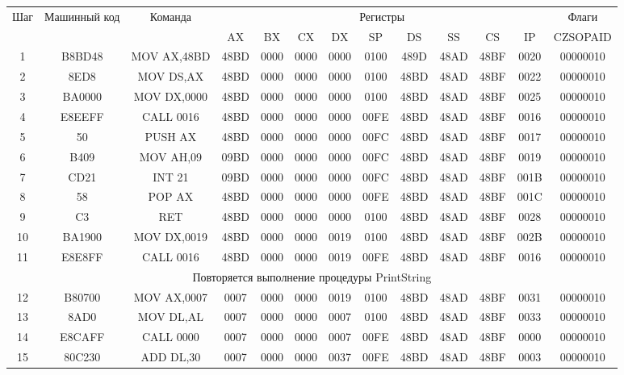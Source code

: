 \begin{tabular}{|c|c|c|c|c|c|c|c|c|c|c|c|c|}
\hline
	Шаг & Машинный код & Команда & \multicolumn{9}{|c|}{Регистры} & Флаги \\
	& & & AX & BX & CX & DX & SP & DS & SS & CS & IP & CZSOPAID \\
\hline
	1 & B8BD48 & MOV AX,48BD & 48BD & 0000 & 0000 & 0000 & 0100 & 489D & 48AD & 48BF & 0020 & 00000010 \\
\hline
	2 & 8ED8 & MOV DS,AX & 48BD & 0000 & 0000 & 0000 & 0100 & 48BD & 48AD & 48BF & 0022 & 00000010 \\
\hline
	3 & BA0000 & MOV DX,0000 & 48BD & 0000 & 0000 & 0000 & 0100 & 48BD & 48AD & 48BF & 0025 & 00000010 \\
\hline
	4 & E8EEFF & CALL 0016 & 48BD & 0000 & 0000 & 0000 & 00FE & 48BD & 48AD & 48BF & 0016 & 00000010 \\
\hline
	5 & 50 & PUSH AX & 48BD & 0000 & 0000 & 0000 & 00FC & 48BD & 48AD & 48BF & 0017 & 00000010 \\
\hline
	6 & B409 & MOV AH,09 & 09BD & 0000 & 0000 & 0000 & 00FC & 48BD & 48AD & 48BF & 0019 & 00000010 \\
\hline
	7 & CD21 & INT 21 & 09BD & 0000 & 0000 & 0000 & 00FC & 48BD & 48AD & 48BF & 001B & 00000010 \\
\hline
	8 & 58 & POP AX & 48BD & 0000 & 0000 & 0000 & 00FE & 48BD & 48AD & 48BF & 001C & 00000010 \\
\hline
	9 & C3 & RET & 48BD & 0000 & 0000 & 0000 & 0100 & 48BD & 48AD & 48BF & 0028 & 00000010 \\
\hline
	10 & BA1900 & MOV DX,0019 & 48BD & 0000 & 0000 & 0019 & 0100 & 48BD & 48AD & 48BF & 002B & 00000010 \\
\hline
	11 & E8E8FF & CALL 0016 & 48BD & 0000 & 0000 & 0019 & 00FE & 48BD & 48AD & 48BF & 0016 & 00000010 \\
\hline
	\multicolumn{13}{|c|}{Повторяется выполнение процедуры PrintString} \\
\hline
	12 & B80700 & MOV AX,0007 & 0007 & 0000 & 0000 & 0019 & 0100 & 48BD & 48AD & 48BF & 0031 & 00000010 \\
\hline
	13 & 8AD0 & MOV DL,AL & 0007 & 0000 & 0000 & 0007 & 0100 & 48BD & 48AD & 48BF & 0033 & 00000010 \\
\hline
	14 & E8CAFF & CALL 0000 & 0007 & 0000 & 0000 & 0007 & 00FE & 48BD & 48AD & 48BF & 0000 & 00000010 \\
\hline
	15 & 80C230 & ADD DL,30 & 0007 & 0000 & 0000 & 0037 & 00FE & 48BD & 48AD & 48BF & 0003 & 00000010 \\

\end{tabular}
